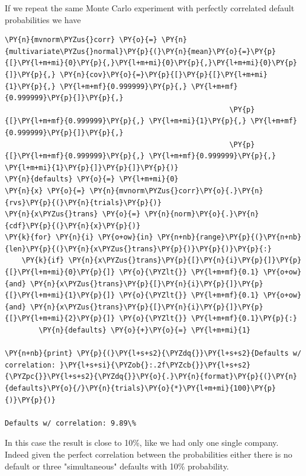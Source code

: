 If we repeat the same Monte Carlo experiment with perfectly correlated
default probabilities we have

\begin{tcolorbox}[breakable, size=fbox, boxrule=1pt, pad at break*=1mm,colback=cellbackground, colframe=cellborder]
\begin{Verbatim}[commandchars=\\\{\}]
\PY{n}{mvnorm\PYZus{}corr} \PY{o}{=} \PY{n}{multivariate\PYZus{}normal}\PY{p}{(}\PY{n}{mean}\PY{o}{=}\PY{p}{[}\PY{l+m+mi}{0}\PY{p}{,}\PY{l+m+mi}{0}\PY{p}{,}\PY{l+m+mi}{0}\PY{p}{]}\PY{p}{,} \PY{n}{cov}\PY{o}{=}\PY{p}{[}\PY{p}{[}\PY{l+m+mi}{1}\PY{p}{,} \PY{l+m+mf}{0.999999}\PY{p}{,} \PY{l+m+mf}{0.999999}\PY{p}{]}\PY{p}{,}
                                                     \PY{p}{[}\PY{l+m+mf}{0.999999}\PY{p}{,} \PY{l+m+mi}{1}\PY{p}{,} \PY{l+m+mf}{0.999999}\PY{p}{]}\PY{p}{,}
                                                     \PY{p}{[}\PY{l+m+mf}{0.999999}\PY{p}{,} \PY{l+m+mf}{0.999999}\PY{p}{,} \PY{l+m+mi}{1}\PY{p}{]}\PY{p}{]}\PY{p}{)}
\PY{n}{defaults} \PY{o}{=} \PY{l+m+mi}{0}
\PY{n}{x} \PY{o}{=} \PY{n}{mvnorm\PYZus{}corr}\PY{o}{.}\PY{n}{rvs}\PY{p}{(}\PY{n}{trials}\PY{p}{)}
\PY{n}{x\PYZus{}trans} \PY{o}{=} \PY{n}{norm}\PY{o}{.}\PY{n}{cdf}\PY{p}{(}\PY{n}{x}\PY{p}{)}
\PY{k}{for} \PY{n}{i} \PY{o+ow}{in} \PY{n+nb}{range}\PY{p}{(}\PY{n+nb}{len}\PY{p}{(}\PY{n}{x\PYZus{}trans}\PY{p}{)}\PY{p}{)}\PY{p}{:}
    \PY{k}{if} \PY{n}{x\PYZus{}trans}\PY{p}{[}\PY{n}{i}\PY{p}{]}\PY{p}{[}\PY{l+m+mi}{0}\PY{p}{]} \PY{o}{\PYZlt{}} \PY{l+m+mf}{0.1} \PY{o+ow}{and} \PY{n}{x\PYZus{}trans}\PY{p}{[}\PY{n}{i}\PY{p}{]}\PY{p}{[}\PY{l+m+mi}{1}\PY{p}{]} \PY{o}{\PYZlt{}} \PY{l+m+mf}{0.1} \PY{o+ow}{and} \PY{n}{x\PYZus{}trans}\PY{p}{[}\PY{n}{i}\PY{p}{]}\PY{p}{[}\PY{l+m+mi}{2}\PY{p}{]} \PY{o}{\PYZlt{}} \PY{l+m+mf}{0.1}\PY{p}{:}
        \PY{n}{defaults} \PY{o}{+}\PY{o}{=} \PY{l+m+mi}{1}

\PY{n+nb}{print} \PY{p}{(}\PY{l+s+s2}{\PYZdq{}}\PY{l+s+s2}{Defaults w/ correlation: }\PY{l+s+si}{\PYZob{}:.2f\PYZcb{}}\PY{l+s+s2}{\PYZpc{}}\PY{l+s+s2}{\PYZdq{}}\PY{o}{.}\PY{n}{format}\PY{p}{(}\PY{n}{defaults}\PY{o}{/}\PY{n}{trials}\PY{o}{*}\PY{l+m+mi}{100}\PY{p}{)}\PY{p}{)}

Defaults w/ correlation: 9.89\%
\end{Verbatim}
\end{tcolorbox}
In this case the result is close to 10\%, like we had only one single company. 
Indeed given the perfect correlation between the probabilities either there is no default or three
"simultaneous" defaults with 10\% probability.

